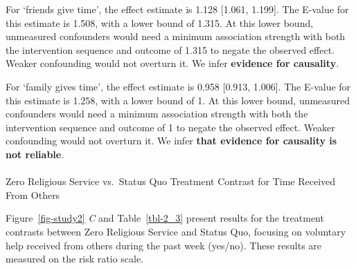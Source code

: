 \documentclass[
  single column]{article}
\makeatletter
\let\oldparagraph\paragraph
\renewcommand{\paragraph}{
    \@ifstar
      \xxxParagraphStar
      \xxxParagraphNoStar
  }
\newcommand{\xxxParagraphStar}[1]{\oldparagraph*{#1}\mbox{}}
\newcommand{\xxxParagraphNoStar}[1]{\oldparagraph{#1}\mbox{}}
\makeatother
\begin{document}
For `friends give time', the effect estimate is 1.128 {[}1.061,
1.199{]}. The E-value for this estimate is 1.508, with a lower bound of
1.315. At this lower bound, unmeasured confounders would need a minimum
association strength with both the intervention sequence and outcome of
1.315 to negate the observed effect. Weaker confounding would not
overturn it. We infer \textbf{evidence for causality}.

For `family gives time', the effect estimate is 0.958 {[}0.913,
1.006{]}. The E-value for this estimate is 1.258, with a lower bound of
1. At this lower bound, unmeasured confounders would need a minimum
association strength with both the intervention sequence and outcome of
1 to negate the observed effect. Weaker confounding would not overturn
it. We infer \textbf{that evidence for causality is not reliable}.

\paragraph{Zero Religious Service vs.~Status Quo Treatment Contrast for
Time Received From
Others}\label{zero-religious-service-vs.-status-quo-treatment-contrast-for-time-received-from-others}

Figure~\ref{fig-study2} \emph{C} and Table~\ref{tbl-2_3} present results
for the treatment contrasts between Zero Religious Service and Status
Quo, focusing on voluntary help received from others during the past
week (yes/no). These results are measured on the risk ratio scale.
\end{document}
